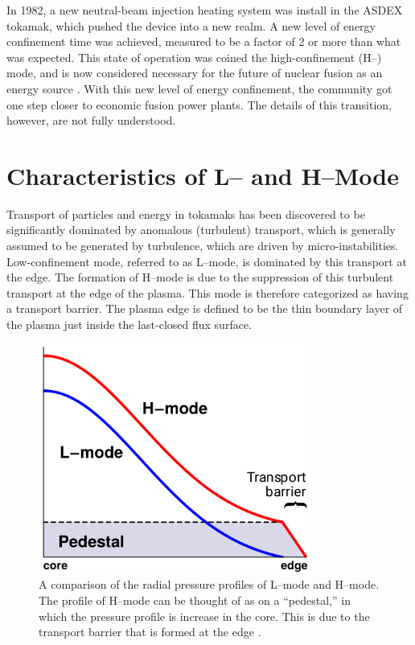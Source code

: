 In 1982, a new neutral-beam injection heating system was install in the ASDEX tokamak, which pushed the device into a new realm.
A new level of energy confinement time was achieved, measured to be a factor of 2 or more than what was expected.
This state of operation was coined the high-confinement (H--) mode, and is now considered necessary for the future of nuclear fusion as an energy source \cite{arnoux_how_2009, wagner_development_1984}.
With this new level of energy confinement, the community got one step closer to economic fusion power plants.
The details of this transition, however, are not fully understood.

\section{Characteristics of L-- and H--Mode}\label{sec:characteristics}
Transport of particles and energy in tokamaks has been discovered to be significantly dominated by anomalous (turbulent) transport, which is generally assumed to be generated by turbulence, which are driven by micro-instabilities.
Low-confinement mode, referred to as L--mode, is dominated by this transport at the edge.
The formation of H--mode is due to the suppression of this turbulent transport at the edge of the plasma.
This mode is therefore categorized as having a transport barrier.
The plasma edge is defined to be the thin boundary layer of the plasma just inside the last-closed flux surface.

\begin{figure}[tb] %
\begin{minipage}{0.49\linewidth}
	\centering
	\includegraphics[width=0.8\textwidth]{../Graphics/L-mode_H-mode_compare.png}
\end{minipage}
\hfill
\begin{minipage}{0.49\linewidth}
	\caption{A comparison of the radial pressure profiles of L--mode and H--mode.
	The profile of H--mode can be thought of as on a ``pedestal,'' in which the pressure profile is increase in the core.
	This is due to the transport barrier that is formed at the edge \cite{weymiens_bifurcation_2014}.}
	\label{fig:L-mode_H-mode_compare}
\end{minipage}
\end{figure}

